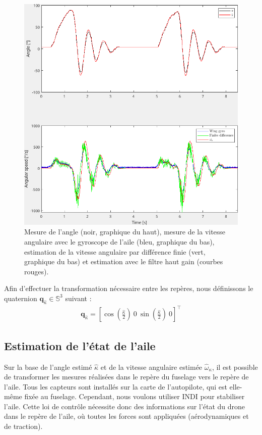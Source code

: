 \begin{figure}[ht!]
\centering
    \includegraphics[width=0.7\columnwidth,angle=0]{figures/highGainFilter.png}
    \caption{Mesure de l'angle (noir, graphique du haut), mesure de la vitesse angulaire avec le gyroscope de l'aile (bleu, graphique du bas), estimation de la vitesse angulaire par différence finie (vert, graphique du bas) et estimation avec le filtre haut gain (courbes rouges).}
    \label{fig:high_gain}
\end{figure}

Afin d'effectuer la transformation nécessaire entre les repères, nous définissons le quaternion $\boldsymbol{q}_{\hat{\kappa}} \in {\mathbb S}^3$ suivant :
\begin{align}
\label{eq:rot_quat}
\boldsymbol{q}_{\hat{\kappa}} =  \left[\cos\left(\frac{\hat{\kappa}}{2}\right) ~ 0 ~ \sin\left(\frac{\hat{\kappa}}{2}\right) ~ 0 \right]^\top
\end{align}


\subsection{Estimation de l'état de l'aile}

Sur la base de l'angle estimé $\hat{\kappa}$ et de la vitesse angulaire estimée $\hat{\omega}_{\kappa}$, il est possible de transformer les mesures réalisées dans le repère du fuselage vers le repère de l'aile. Tous les capteurs sont installés sur la carte de l'autopilote, qui est elle-même fixée au fuselage. Cependant, nous voulons utiliser INDI pour stabiliser l'aile. Cette loi de contrôle nécessite donc des informations sur l'état du drone dans le repère de l'aile, où toutes les forces sont appliquées (aérodynamiques et de traction).

